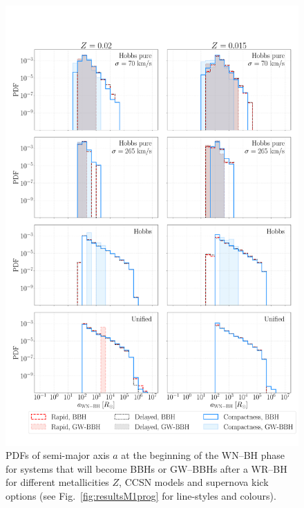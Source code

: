 \documentclass[a4paper,titlepage]{book}     	%
\begin{document}
\begin{figure}[h!]
	\centering
	\includegraphics[width=\textwidth]{./images/WRBH-anonpureHe.pdf}	
	\caption{PDFs of semi-major axis $a$ at the beginning of the WN--BH phase for systems that will become BBHs or GW--BBHs after a WR--BH for different metallicities $Z$, CCSN models and supernova kick options (see Fig.\ \ref{fig:resultsM1prog} for line-styles and colours).}\label{fig:resultsWRBH-anonpureHe}
\end{figure}
\end{document}
